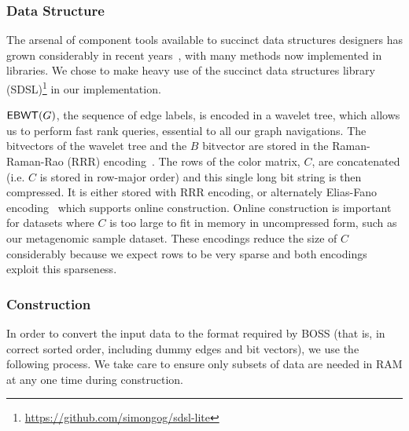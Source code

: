 

\subsubsection{Data Structure}

The arsenal of component tools available to succinct data structures designers has grown considerably in recent years~\citep{Navarro16}, with many methods now implemented in libraries. We chose to make heavy use of the succinct data structures library (SDSL)\footnote{\url{https://github.com/simongog/sdsl-lite}}
in our implementation.

\(\mathsf{EBWT} (G)\), the sequence of edge labels, is encoded in a wavelet tree, which allows us to perform fast rank queries, essential to all our graph navigations. The bitvectors of the wavelet tree  and the $B$ bitvector are stored in the Raman-Raman-Rao (RRR) encoding~\citep{RRR07}.
The rows of the color matrix, $C$, are concatenated (i.e. $C$ is stored in row-major order) and this single long bit string is then compressed.  It is either stored with RRR encoding,  or alternately Elias-Fano encoding~\citep{elias1974efficient,fano1971number,bitvector} which supports online construction.  Online construction is important for datasets where $C$ is too large to fit in memory in uncompressed form, such as our metagenomic sample dataset.  These encodings reduce the size of $C$ considerably because we expect rows to be very sparse
and both encodings exploit this sparseness.

\subsubsection{Construction}


In order to convert the input data to the format required by BOSS (that is, in correct sorted order, including dummy edges and bit vectors), we use the following process.  We take care to ensure only subsets of data are needed in RAM at any one time during construction.


